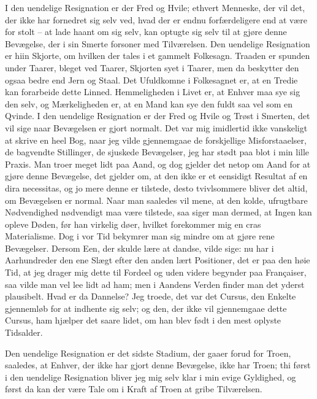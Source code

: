 \documentclass[12pt,a4paper]{article}
\begin{document}
I den uendelige Resignation er der Fred og Hvile; ethvert Menneske, der vil det, der ikke har fornedret sig selv ved, hvad der er endnu forfærdeligere end at være for stolt – at lade haant om sig selv, kan optugte sig selv til at gjøre denne Bevægelse, der i sin Smerte forsoner med Tilværelsen. Den uendelige Resignation er hiin Skjorte, om hvilken der tales i et gammelt Folkesagn. Traaden er spunden under Taarer, bleget ved Taarer, Skjorten syet i Taarer, men da beskytter den ogsaa bedre end Jern og Staal. Det Ufuldkomne i Folkesagnet er, at en Tredie kan forarbeide dette Linned. Hemmeligheden i Livet er, at Enhver maa sye sig den selv, og Mærkeligheden er, at en Mand kan sye den fuldt saa vel som en Qvinde. I den uendelige Resignation er der Fred og Hvile og Trøst i Smerten, det vil sige naar Bevægelsen er gjort normalt. Det var mig imidlertid ikke vanskeligt at skrive en heel Bog, naar jeg vilde gjennemgaae de forskjellige Misforstaaelser, de bagvendte Stillinger, de sjuskede Bevægelser, jeg har stødt paa blot i min lille Praxis. Man troer meget lidt paa Aand, og dog gjelder det netop om Aand for at gjøre denne Bevægelse, det gjelder om, at den ikke er et eensidigt Resultat af en dira necessitas, og jo mere denne er tilstede, desto tvivlsommere bliver det altid, om Bevægelsen er normal. Naar man saaledes vil mene, at den kolde, ufrugtbare Nødvendighed nødvendigt maa være tilstede, saa siger man dermed, at Ingen kan opleve Døden, før han virkelig døer, hvilket forekommer mig en cras Materialisme. Dog i vor Tid bekymrer man sig mindre om at gjøre rene Bevægelser. Dersom Een, der skulde lære at dandse, vilde sige: nu har i Aarhundreder den ene Slægt efter den anden lært Positioner, det er paa den høie Tid, at jeg drager mig dette til Fordeel og uden videre begynder paa Françaiser, saa vilde man vel lee lidt ad ham; men i Aandens Verden finder man det yderst plausibelt. Hvad er da Dannelse? Jeg troede, det var det Cursus, den Enkelte gjennemløb for at indhente sig selv; og den, der ikke vil gjennemgaae dette Cursus, ham hjælper det saare lidet, om han blev født i den mest oplyste Tidsalder.

Den uendelige Resignation er det sidste Stadium, der gaaer forud for Troen, saaledes, at Enhver, der ikke har gjort denne Bevægelse, ikke har Troen; thi først i den uendelige Resignation bliver jeg mig selv klar i min evige Gyldighed, og først da kan der være Tale om i Kraft af Troen at gribe Tilværelsen.
\end{document}
